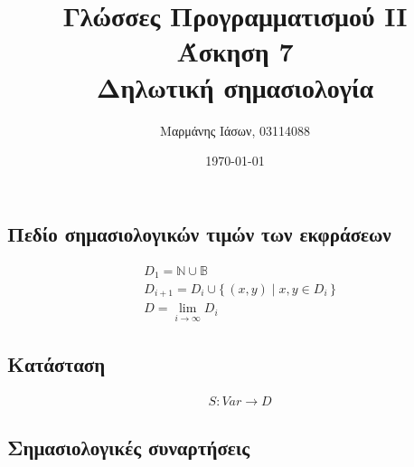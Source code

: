 \documentclass[a4paper,oneside, 12pt, fleqn]{article}
\title{
	\textbf{Γλώσσες Προγραμματισμού II}\\
	Άσκηση 7\\
	Δηλωτική σημασιολογία
 }
\author{
	Μαρμάνης Ιάσων, 03114088
}
\date{\today}
\begin{document}
\maketitle

\subsection*{Πεδίο σημασιολογικών τιμών των εκφράσεων}

\begin{align*}
&D_1 = \mathbb{N} \cup\mathbb{B} \\
&D_{i+1} = D_i \cup \{\,(x,y) \mid x, y \in D_i \,\} \\
&D = \lim_{i\to\infty} D_i
\end{align*}

\subsection*{Κατάσταση}

\begin{align*}
&S : Var \rightarrow D
\end{align*}

\subsection*{Σημασιολογικές συναρτήσεις}
\end{document}
